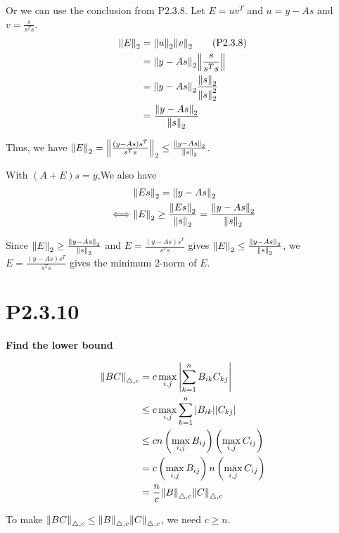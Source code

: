 \documentclass{article}
\begin{document}
Or we can use the conclusion from P2.3.8.
Let $E = uv^T$ and $u = y - As$ and $v = \frac{s}{s^Ts}$.
\begin{align*}
    \norm{E}_2
     & = \norm{u}_2\norm{v}_2 \tag*{(P2.3.8)}          \\
     & = \norm{y-As}_2 \norm{ \frac{s}{s^Ts}}          \\
     & = \norm{y-As}_2 \frac{\norm{s}_2}{\norm{s}_2^2} \\
     & = \frac{\norm{y-As}_2}{\norm{s}_2}
\end{align*}

Thus, we have $\norm{E}_2=\norm{\frac{(y-As)s^T}{s^Ts}}_2 \le \frac{\norm{y-As}_2}{\norm{s}_2}$.

With $(A+E)s=y$,We also have
\begin{align*}
         & \norm{Es}_2 = \norm{y-As}_2                                                      \\
    \iff & \norm{E}_2 \ge \frac{\norm{Es}_2}{\norm{s}_2} = \frac{\norm{y-As}_2}{\norm{s}_2}
\end{align*}

Since $\norm{E}_2 \ge \frac{\norm{y-As}_2}{\norm{s}_2}$
and $E=\frac{(y-As)s^T}{s^Ts}$ gives $\norm{E}_2\le \frac{\norm{y-As}_2}{\norm{s}_2}$,
we $E=\frac{(y-As)s^T}{s^Ts}$ gives the minimum 2-norm of $E$.

\section*{P2.3.10}

\textbf{Find the lower bound}

\begin{align*}
    \norm{BC}_{\triangle, c}
     & =  c \max_{i,j}
    \left|
    \sum_{k=1}^n B_{ik} C_{kj}
    \right|                                                               \\
     & \le c \max_{i,j}
    \sum_{k=1}^n |B_{ik}||C_{kj}|                                         \\
     & \le cn \left(\max_{i,j}B_{ij}\right) \left(\max_{i,j}C_{ij}\right) \\
     & = c \left(\max_{i,j}B_{ij}\right) n \left(\max_{i,j}C_{ij}\right)  \\
     & = \frac{n}{c}\norm{B}_{\triangle, c}\norm{C}_{\triangle, c}
\end{align*}

To make $\norm{BC}_{\triangle, c} \le\norm{B}_{\triangle, c}\norm{C}_{\triangle, c} $,
we need $c\ge n$.
\end{document}

